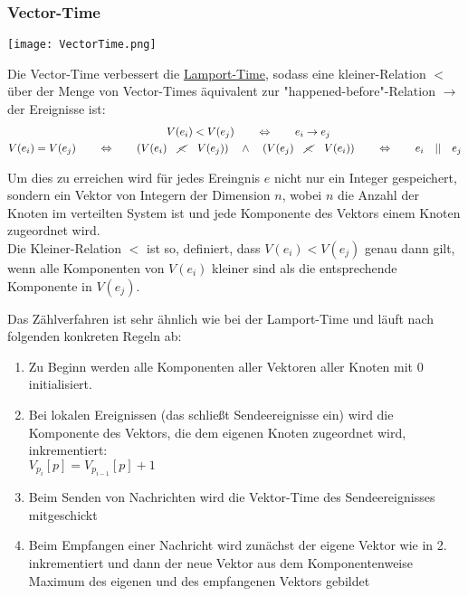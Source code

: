 \subsubsection{Vector-Time}
\label{sec:vector-time}

\texttt{[image: VectorTime.png]}

Die Vector-Time verbessert die \hyperref[sec:lamport-time]{Lamport-Time}, sodass eine kleiner-Relation $<$  über der Menge von Vector-Times äquivalent zur "happened-before"-Relation $\rightarrow$ der Ereignisse ist:
\begin{align*}
    V(e_{i}) < V(e_{j}) \qquad \Leftrightarrow \qquad e_{i} \rightarrow e_{j} \qquad \qquad \qquad \qquad \qquad \qquad \\
    V(e_{i}) = V(e_{j}) \qquad \Leftrightarrow \qquad (V(e_{i}) \quad \cancel{<} \quad V(e_{j})) \quad \wedge \quad (V(e_{j}) \quad \cancel{<} \quad V(e_{i})) \qquad \Leftrightarrow \qquad e_{i} \quad || \quad e_{j}
\end{align*}

Um dies zu erreichen wird für jedes Ereingnis $e$ nicht nur ein Integer gespeichert, sondern ein Vektor von Integern der Dimension $n$, wobei $n$ die Anzahl der Knoten im verteilten System ist und jede Komponente des Vektors einem Knoten zugeordnet wird.\\
Die Kleiner-Relation $<$ ist so, definiert, dass $V(e_{i}) < V(e_{j})$ genau dann gilt, wenn alle Komponenten von $V(e_{i})$ kleiner sind als die entsprechende Komponente in $V(e_{j})$.

Das Zählverfahren ist sehr ähnlich wie bei der Lamport-Time und läuft nach folgenden konkreten Regeln ab:
\begin{enumerate}
    \item Zu Beginn werden alle Komponenten aller Vektoren aller Knoten mit $0$ initialisiert.
    \item Bei lokalen Ereignissen (das schließt Sendeereignisse ein) wird die Komponente des Vektors, die dem eigenen Knoten zugeordnet wird, inkrementiert:\\
          $V_{p_{i}}[p] = V_{p_{i-1}}[p] + 1$
    \item Beim Senden von Nachrichten wird die Vektor-Time des Sendeereignisses mitgeschickt
    \item Beim Empfangen einer Nachricht wird zunächst der eigene Vektor wie in 2. inkrementiert und dann der neue Vektor aus dem Komponentenweise Maximum des eigenen und des empfangenen Vektors gebildet
\end{enumerate}

